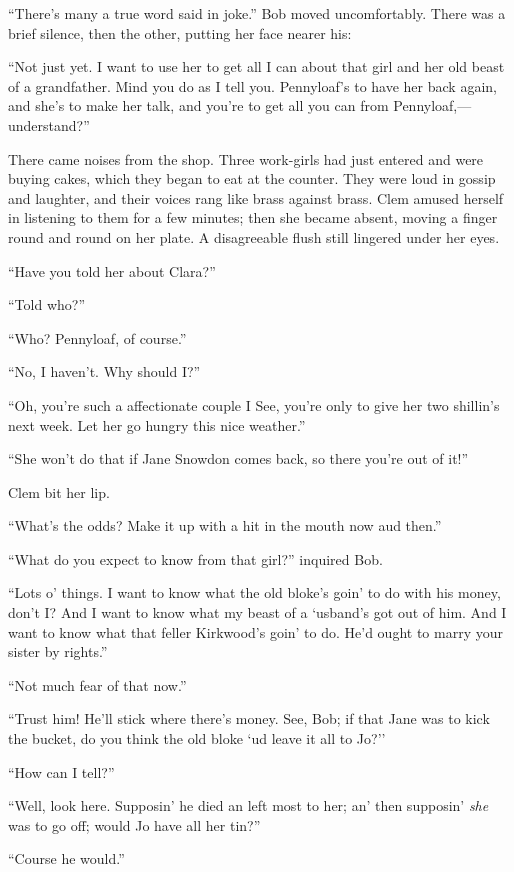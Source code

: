 ``There's many a true word said in joke.'' Bob moved uncomfortably.
There was a brief silence, then the other, putting her face nearer his:

``Not just yet. I want to use her to get all I can about that girl and
her old beast of a grandfather. Mind you do as I tell you. Pennyloaf's
to have her back again, and she's to make her talk, and you're to get
all you can from Pennyloaf,---understand?''

There came noises from the shop. Three work-girls had just entered and
were buying {}cakes, which they began to eat at the counter. They were
loud in gossip and laughter, and their voices rang like brass against
brass. Clem amused herself in listening to them for a few minutes; then
she became absent, moving a finger round and round on her plate. A
disagreeable flush still lingered under her eyes.

``Have you told her about Clara?''

``Told who?''

``Who? Pennyloaf, of course.''

``No, I haven't. Why should I?''

``Oh, you're such a affectionate couple I See, you're only to give her
two shillin's next week. Let her go hungry this nice weather.''

``She won't do that if Jane Snowdon comes back, so there you're out of
it!''

Clem bit her lip.

``What's the odds? Make it up with a hit in the mouth now aud then.''

``What do you expect to know from that girl?'' inquired Bob.

``Lots o' things. I want to know what the old bloke's goin' to do with
his money, don't I? And I want to know what my beast of a `usband's got
out of him. And I want to know what that feller Kirkwood's goin' to
{}do. He'd ought to marry your sister by rights.''

``Not much fear of that now.''

``Trust him! He'll stick where there's money. See, Bob; if that Jane was
to kick the bucket, do you think the old bloke `ud leave it all to Jo?''

``How can I tell?''

``Well, look here. Supposin' he died an left most to her; an' then
supposin' \emph{she} was to go off; would Jo have all her tin?''

``Course he would.''


